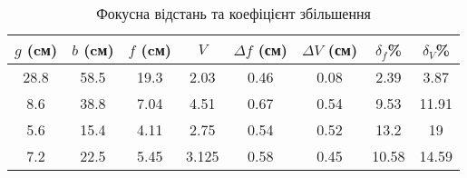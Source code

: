\begin{table}[h] \label{table:fV}
    \centering
    \begin{tabular}{ |c|c|c|c|c|c|c|c| }
        \hline 
        $g$ \textbf{(cм)} & $b$ \textbf{(cм)} & $f$ \textbf{(cм)} & $V$ & $\Delta f$ \textbf{(см)} & $\Delta V$ \textbf{(см)} & $\delta_f$\% & $\delta_V$\% \\
        \hline
        28.8 & 58.5 & 19.3 & 2.03 & 0.46 & 0.08 & 2.39 & 3.87 \\
        \hline
        8.6 & 38.8 & 7.04 & 4.51 & 0.67 & 0.54 & 9.53 & 11.91 \\
        \hline
        5.6 & 15.4 & 4.11 & 2.75 & 0.54 & 0.52 & 13.2 & 19 \\
        \hline
        7.2 & 22.5 & 5.45 & 3.125 & 0.58 & 0.45 & 10.58 & 14.59 \\
        \hline
    \end{tabular}
    \caption{Фокусна відстань та коефіцієнт збільшення}
\end{table}

